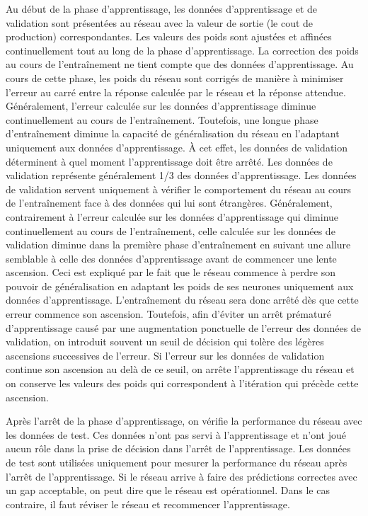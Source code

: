 Au début de la phase d'apprentissage, les données d'apprentissage et de validation sont présentées au réseau avec la valeur de sortie (le cout de production) correspondantes. Les valeurs des poids sont ajustées et affinées continuellement tout au long de la phase d'apprentissage. La correction des poids au cours de l'entraînement ne tient compte que des données d'apprentissage. Au cours de cette phase, les poids du réseau sont corrigés de manière à minimiser l'erreur au carré entre la réponse calculée par le réseau et la réponse attendue. Généralement, l'erreur calculée sur les données d'apprentissage diminue continuellement au cours de l'entraînement. Toutefois, une longue phase d'entraînement diminue la capacité de généralisation du réseau en l'adaptant uniquement aux données d'apprentissage. À cet effet, les données de validation déterminent à quel moment l'apprentissage doit être arrêté. Les données de validation représente généralement 1/3 des données d'apprentissage. Les données de validation servent uniquement à vérifier le comportement du réseau au cours de l'entraînement face à des données qui lui sont étrangères.
Généralement, contrairement à l'erreur calculée sur les données d'apprentissage qui diminue continuellement au cours de l'entraînement, celle calculée sur les données de validation diminue dans la première phase d'entraînement en suivant une allure semblable à celle des données d'apprentissage avant de commencer une lente ascension. Ceci est expliqué par le fait que le réseau commence à perdre son pouvoir de généralisation en adaptant les poids de ses neurones uniquement aux données d'apprentissage. L'entraînement du réseau sera donc arrêté dès que cette erreur commence son ascension. Toutefois, afin d'éviter un arrêt prématuré d'apprentissage causé par une augmentation ponctuelle de l'erreur des données de validation, on introduit souvent un seuil de décision qui tolère des légères ascensions successives de l'erreur. Si l'erreur sur les données de validation continue son ascension au delà de ce seuil, on arrête l'apprentissage du réseau et on conserve les valeurs des poids qui correspondent à l'itération qui précède cette ascension.

Après l'arrêt de la phase d'apprentissage, on vérifie la performance du réseau avec les données de test. Ces données n'ont pas servi à l'apprentissage et n'ont joué aucun rôle dans la prise de décision dans l'arrêt de l'apprentissage. Les données de test sont utilisées uniquement pour mesurer la performance du réseau après l'arrêt de l'apprentissage. Si le réseau arrive à faire des prédictions correctes avec un gap acceptable, on peut dire que le réseau est opérationnel. Dans le cas contraire, il faut réviser le réseau et recommencer l'apprentissage. 

